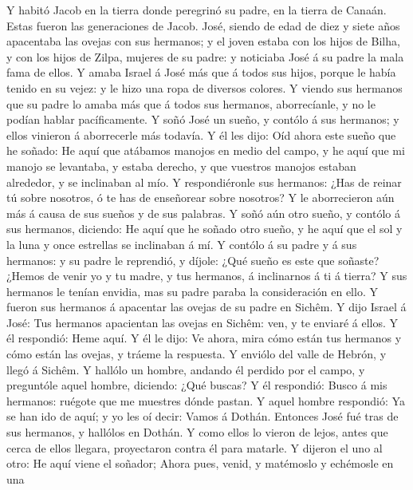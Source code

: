  Y habitó Jacob en la tierra donde peregrinó su padre, en la
tierra de Canaán.  Estas fueron las generaciones de Jacob.
José, siendo de edad de diez y siete años apacentaba las ovejas con sus
hermanos; y el joven estaba con los hijos de Bilha, y con los hijos de
Zilpa, mujeres de su padre: y noticiaba José á su padre la mala fama de
ellos.  Y amaba Israel á José más que á todos sus hijos,
porque le había tenido en su vejez: y le hizo una ropa de diversos
colores.  Y viendo sus hermanos que su padre lo amaba más
que á todos sus hermanos, aborrecíanle, y no le podían hablar
pacíficamente.  Y soñó José un sueño, y contólo á sus
hermanos; y ellos vinieron á aborrecerle más todavía.  Y él
les dijo: Oíd ahora este sueño que he soñado:  He aquí que
atábamos manojos en medio del campo, y he aquí que mi manojo se
levantaba, y estaba derecho, y que vuestros manojos estaban alrededor, y
se inclinaban al mío.  Y respondiéronle sus hermanos: ¿Has
de reinar tú sobre nosotros, ó te has de enseñorear sobre nosotros? Y le
aborrecieron aún más á causa de sus sueños y de sus palabras.
 Y soñó aún otro sueño, y contólo á sus hermanos, diciendo:
He aquí que he soñado otro sueño, y he aquí que el sol y la luna y once
estrellas se inclinaban á mí.  Y contólo á su padre y á sus
hermanos: y su padre le reprendió, y díjole: ¿Qué sueño es este que
soñaste? ¿Hemos de venir yo y tu madre, y tus hermanos, á inclinarnos á
ti á tierra?  Y sus hermanos le tenían envidia, mas su
padre paraba la consideración en ello.  Y fueron sus
hermanos á apacentar las ovejas de su padre en Sichêm.  Y
dijo Israel á José: Tus hermanos apacientan las ovejas en Sichêm: ven, y
te enviaré á ellos. Y él respondió: Heme aquí.  Y él le
dijo: Ve ahora, mira cómo están tus hermanos y cómo están las ovejas, y
tráeme la respuesta. Y enviólo del valle de Hebrón, y llegó á Sichêm.
 Y hallólo un hombre, andando él perdido por el campo, y
preguntóle aquel hombre, diciendo: ¿Qué buscas?  Y él
respondió: Busco á mis hermanos: ruégote que me muestres dónde pastan.
 Y aquel hombre respondió: Ya se han ido de aquí; y yo les
oí decir: Vamos á Dothán. Entonces José fué tras de sus hermanos, y
hallólos en Dothán.  Y como ellos lo vieron de lejos, antes
que cerca de ellos llegara, proyectaron contra él para matarle.
 Y dijeron el uno al otro: He aquí viene el soñador;
 Ahora pues, venid, y matémoslo y echémosle en una
